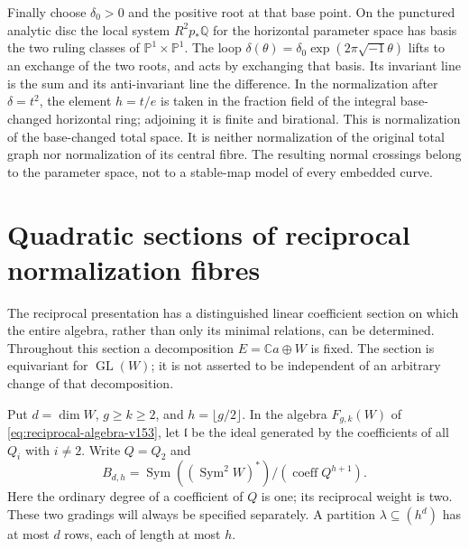 \documentclass[11pt,reqno]{amsart}
\numberwithin{equation}{section}
\theoremstyle{definition}\newtheorem{definition}[theorem]{Definition}
\theoremstyle{remark}\newtheorem{remark}[theorem]{Remark}
\newcommand{\C}{\mathbb C}\newcommand{\Q}{\mathbb Q}
\newcommand{\Pj}{\mathbb P}\newcommand{\A}{\mathbb A}
\DeclareMathOperator{\Sym}{Sym}\DeclareMathOperator{\Gr}{Gr}
\begin{document}
Finally choose $\delta_0>0$ and the positive root at that base point.
On the punctured analytic disc the local system
$R^2p_*\Q$ for the horizontal parameter space has basis the two
ruling classes of $\Pj^1\times\Pj^1$. The loop
$\delta(\theta)=\delta_0\exp(2\pi\sqrt{-1}\theta)$ lifts to an
exchange of the two roots, and acts by exchanging that basis.
Its invariant line is the sum and its anti-invariant line the
difference. In the normalization after $\delta=t^2$, the element
$h=t/e$ is taken in the fraction field of the integral base-changed
horizontal ring; adjoining it is finite and birational. This is
normalization of the base-changed total space. It is neither
normalization of the original total graph nor normalization of
its central fibre. The resulting normal crossings belong to the
parameter space, not to a stable-map model of every embedded curve.

\section{Quadratic sections of reciprocal normalization fibres}
\label{sec:quadratic-sections-v155}
The reciprocal presentation has a distinguished linear coefficient
section on which the entire algebra, rather than only its minimal
relations, can be determined.  Throughout this section a decomposition
$E=\C a\oplus W$ is fixed.  The section is equivariant for
$\operatorname{GL}(W)$; it is not asserted to be independent of an
arbitrary change of that decomposition.

Put $d=\dim W$, $g\geq k\geq2$, and $h=\lfloor g/2\rfloor$.
In the algebra $F_{g,k}(W)$ of \eqref{eq:reciprocal-algebra-v153},
let $\mathfrak l$ be the ideal generated by the coefficients of all
$Q_i$ with $i\ne2$.  Write $Q=Q_2$ and
\begin{equation}\label{eq:quadratic-section-v155}
 B_{d,h}=\Sym((\Sym^2W)^*)/
                    (\operatorname{coeff}Q^{h+1}).
\end{equation}
Here the ordinary degree of a coefficient of $Q$ is one; its
reciprocal weight is two.  These two gradings will always be
specified separately.  A partition $\lambda\subseteq(h^d)$ has
at most $d$ rows, each of length at most $h$.
\end{document}
